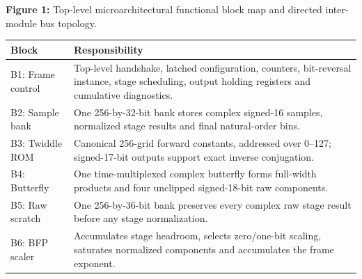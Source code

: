 \documentclass[11pt,a4paper]{article}
\begin{document}
\begin{center}
\begin{minipage}{\textwidth}
\par\vspace{3pt}

{\small\textbf{Figure 1:} Top-level microarchitectural functional block map and directed inter-module bus topology.}\end{minipage}\end{center}

{\small\renewcommand{\arraystretch}{1.18}\begin{longtable}{@{}L{0.24\textwidth}|L{0.7\textwidth}@{}}\toprule

\textbf{Block} & \textbf{Responsibility}\\\midrule\endhead

B1: Frame control & Top-level handshake,\allowbreak{} latched configuration,\allowbreak{} counters,\allowbreak{} bit-reversal instance,\allowbreak{} stage scheduling,\allowbreak{} output holding registers and cumulative diagnostics.\\[2pt]\hline

B2: Sample bank & One 256-by-32-bit bank stores complex signed-16 samples,\allowbreak{} normalized stage results and final natural-order bins.\\[2pt]\hline

B3: Twiddle ROM & Canonical 256-grid forward constants,\allowbreak{} addressed over 0–127; signed-17-bit outputs support exact inverse conjugation.\\[2pt]\hline

B4: Butterfly & One time-multiplexed complex butterfly forms full-width products and four unclipped signed-18-bit raw components.\\[2pt]\hline

B5: Raw scratch & One 256-by-36-bit bank preserves every complex raw stage result before any stage normalization.\\[2pt]\hline

B6: BFP scaler & Accumulates stage headroom,\allowbreak{} selects zero/\allowbreak{}one-bit scaling,\allowbreak{} saturates normalized components and accumulates the frame exponent.\\[2pt]\hline

\bottomrule\end{longtable}}
\end{document}
